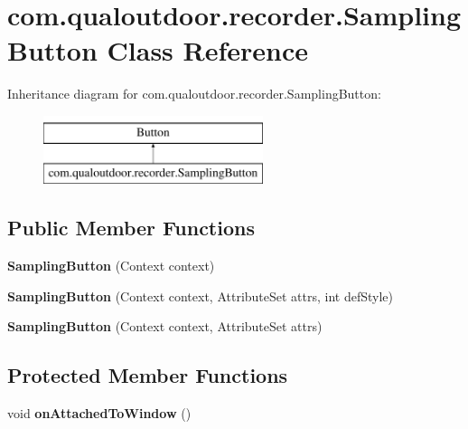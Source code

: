 \hypertarget{classcom_1_1qualoutdoor_1_1recorder_1_1SamplingButton}{\section{com.\-qualoutdoor.\-recorder.\-Sampling\-Button Class Reference}
\label{classcom_1_1qualoutdoor_1_1recorder_1_1SamplingButton}
}
Inheritance diagram for com.\-qualoutdoor.\-recorder.\-Sampling\-Button\-:\begin{figure}[H]
\begin{center}
\leavevmode
\includegraphics[height=2.000000cm]{classcom_1_1qualoutdoor_1_1recorder_1_1SamplingButton}
\end{center}
\end{figure}
\subsection*{Public Member Functions}
\begin{DoxyCompactItemize}
\item 
\hypertarget{classcom_1_1qualoutdoor_1_1recorder_1_1SamplingButton_a55589a649bdfe2239dfd393b881ce54f}{{\bfseries Sampling\-Button} (Context context)}\label{classcom_1_1qualoutdoor_1_1recorder_1_1SamplingButton_a55589a649bdfe2239dfd393b881ce54f}

\item 
\hypertarget{classcom_1_1qualoutdoor_1_1recorder_1_1SamplingButton_a8b79ac727cf80e71c7645e04c85b43cd}{{\bfseries Sampling\-Button} (Context context, Attribute\-Set attrs, int def\-Style)}\label{classcom_1_1qualoutdoor_1_1recorder_1_1SamplingButton_a8b79ac727cf80e71c7645e04c85b43cd}

\item 
\hypertarget{classcom_1_1qualoutdoor_1_1recorder_1_1SamplingButton_a4b2541d9897473bd79bcc5f5549971d7}{{\bfseries Sampling\-Button} (Context context, Attribute\-Set attrs)}\label{classcom_1_1qualoutdoor_1_1recorder_1_1SamplingButton_a4b2541d9897473bd79bcc5f5549971d7}

\end{DoxyCompactItemize}
\subsection*{Protected Member Functions}
\begin{DoxyCompactItemize}
\item 
\hypertarget{classcom_1_1qualoutdoor_1_1recorder_1_1SamplingButton_a087dee4090dc9aba9ef58b6a419ea128}{void {\bfseries on\-Attached\-To\-Window} ()}\label{classcom_1_1qualoutdoor_1_1recorder_1_1SamplingButton_a087dee4090dc9aba9ef58b6a419ea128}

\end{DoxyCompactItemize}
